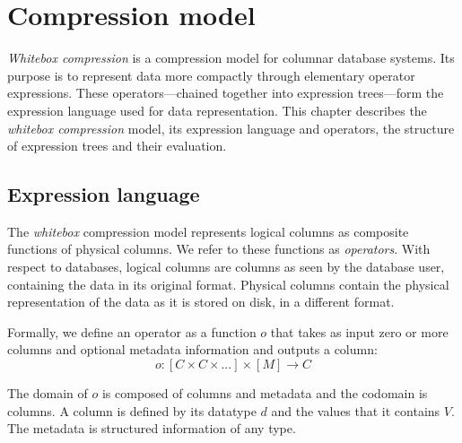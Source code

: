 
\chapter{Compression model}
\label{ch:exprlang}



\graphicspath{{4_expression_language/images/}}

% 

\textit{Whitebox compression} is a compression model for columnar database systems. Its purpose is to represent data more compactly through elementary operator expressions. These operators---chained together into expression trees---form the expression language used for data representation. This chapter describes the \textit{whitebox compression} model, its expression language and operators, the structure of expression trees and their evaluation.

\section{Expression language}
\label{sec:exprlang:exprlang}

The \textit{whitebox} compression model represents logical columns as composite functions of physical columns. We refer to these functions as \textit{operators}. With respect to databases, logical columns are columns as seen by the database user, containing the data in its original format. Physical columns contain the physical representation of the data as it is stored on disk, in a different format.

Formally, we define an operator as a function \(o\) that takes as input zero or more columns and optional metadata information and outputs a column: 
\begin{equation}
\label{eq:exprlang:exprlang:operator}
    o \colon [C \times C \times ...] \times [M] \to C
\end{equation}

The domain of \(o\) is composed of columns and metadata and the codomain is columns. A column is defined by its datatype \(d\) and the values that it contains \(V\). The metadata is structured information of any type.



